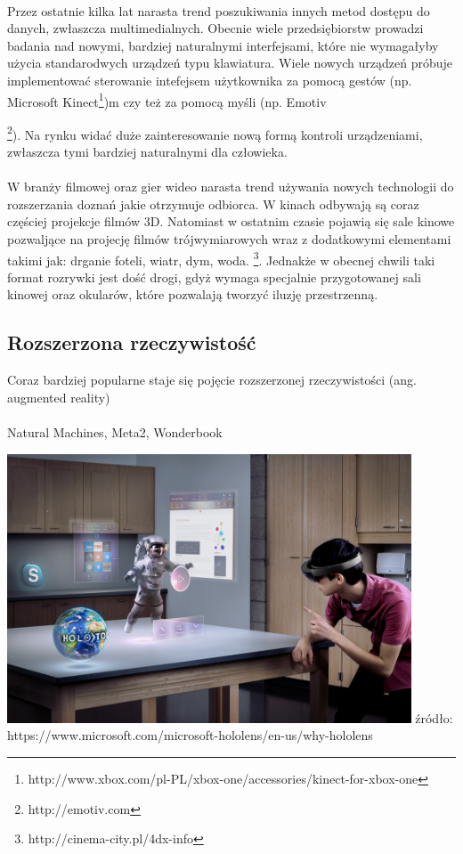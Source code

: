\documentclass[12pt]{article}
\begin{document}
\paragraph{}
Przez ostatnie kilka lat narasta trend poszukiwania innych metod dostępu do danych, zwłaszcza multimedialnych. Obecnie wiele przedsiębiorstw prowadzi badania nad nowymi, bardziej naturalnymi interfejsami, które nie wymagałyby użycia standarodwych urządzeń typu klawiatura.
Wiele nowych urządzeń próbuje implementować sterowanie intefejsem użytkownika za pomocą gestów (np. Microsoft Kinect\footnote{http://www.xbox.com/pl-PL/xbox-one/accessories/kinect-for-xbox-one})m czy też za pomocą myśli (np. Emotiv {\footnote{http://emotiv.com}). Na rynku widać duże zainteresowanie nową formą kontroli urządzeniami, zwłaszcza tymi bardziej naturalnymi dla człowieka.
\paragraph{}
W branży filmowej oraz gier wideo narasta trend używania nowych technologii do rozszerzania doznań jakie otrzymuje odbiorca.
W kinach odbywają są coraz częściej projekcje filmów 3D. Natomiast w ostatnim czasie pojawią się sale kinowe pozwaljące  na projecję filmów trójwymiarowych wraz z dodatkowymi elementami takimi jak: drganie foteli, wiatr, dym, woda. \footnote{http://cinema-city.pl/4dx-info}. Jednakże w obecnej chwili taki format rozrywki jest dość drogi, gdyż wymaga specjalnie przygotowanej sali kinowej oraz okularów, które pozwalają tworzyć iluzję przestrzenną. 

\subsection{Rozszerzona rzeczywistość}
Coraz bardziej popularne staje się pojęcie rozszerzonej rzeczywistości (ang. augmented reality)

\paragraph{}
Natural Machines, Meta2, Wonderbook
\begin{center}
\includegraphics[width=0.9\textwidth]{images/hololens.png}
\small {źródło: https://www.microsoft.com/microsoft-hololens/en-us/why-hololens }
\end{center}


}
\end{document}
